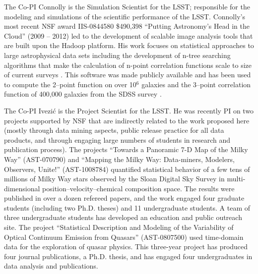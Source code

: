The Co-PI Connolly is the Simulation Scientist for the LSST; responsible for the
modeling and simulations of the scientific performance of the
LSST. Connolly's most recent NSF award IIS-0844580 \$490,398 ``Putting
Astronomy's Head in the Cloud'' (2009 -- 2012) led to the development
of scalable image analysis tools that are built upon the Hadoop
platform\citep{wiley2011}. His work focuses on statistical approaches
to large astrophysical data sets including the development of n-tree
searching algorithms that make the calculation of n-point correlation
functions scale to size of current surveys \cite{Moore00}. This
software was made publicly available and has been used to compute the
2--point function on over 10$^6$ galaxies and the 3--point correlation
function of 400,000 galaxies from the SDSS survey
\cite{Scranton2002,Szapudi2002,Nichol2006,mcbride2011a,mcbride2011b}. 

The Co-PI Ivezi\'{c} is the Project Scientist for the LSST. He was
recently PI on two projects supported by NSF that are indirectly
related to the work proposed here (mostly through data mining aspects,
public release practice for all data products, and through engaging
large numbers of students in research and publication process).
The projects ``Towards a Panoramic 7-D Map of the Milky Way''
(AST-070790) and ``Mapping the Milky Way: Data-miners, Modelers,
Observers, Unite!'' (AST-1008784) quantified statistical behavior of a
few tens of millions of Milky Way stars observed by the Sloan Digital
Sky Survey in multi-dimensional position--velocity--chemical
composition space. The results were published in over a dozen refereed
papers, and the work engaged four graduate students (including two
Ph.D. theses) and 11 undergraduate students.  A team of three
undergraduate students has developed an education and public outreach
site.
The project ``Statistical Description and Modeling of the Variability
of Optical Continuum Emission from Quasars'' (AST-0807500) used
time-domain data for the exploration of quasar physics. This
three-year project has produced four journal publications, a
Ph.D. thesis, and has engaged four undergraduates in data analysis and
publications.

